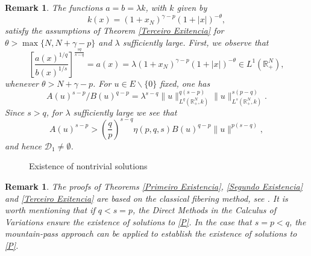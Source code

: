 \documentclass[12pt,reqno]{amsart}
\newtheorem{remark}[theorem]{Remark}
\begin{document}
\begin{remark}
The functions $a=b=\lambda k$, with $k$ given by
\[
k(x)=(1+x_N)^{\gamma-p}(1+|x|)^{-\theta},
\]
satisfy the assumptions of Theorem \ref{Terceiro Exitencia} for $\theta>\max\{N,N+\gamma-p\}$ and $\lambda$ sufficiently large. First, we observe that 
\[
\left[\frac{a(x)^{1/q}}{b(x)^{1/s}}\right]^{\frac{sq}{s-q}}=a(x)=\lambda (1+x_N)^{\gamma-p}(1+|x|)^{-\theta}\in L^1(\mathds{R}^N_+), 
\]
whenever $\theta>N+\gamma-p$. For $u \in E\backslash\{0\}$ fixed, one has 
$$
{A(u)^{s-p}}/{B(u)^{q-p}}=\lambda^{s-q}\|u\|_{L^q(\mathds{R}^N_+,k)}^{q(s-p)}\|u\|_{L^s(\mathds{R}^N_+,k)}^{s(p-q)}.
$$
Since $s>q$, for $\lambda$ sufficiently large we see that $$
A(u)^{s-p}>\left(\frac{q}{p}\right)^{s-q}\eta(p,q,s)B(u)^{q-p}\|u\|^{p(s-q)},
$$ 
and hence $\mathcal{D}_1\neq \emptyset$.
\end{remark}

\begin{figure}[h]
    \centering
{}
    \caption{Existence of nontrivial solutions}
    \label{fig:enter-label}
\end{figure}

\begin{remark}
    The proofs of Theorems \ref{Primeiro Existencia}, \ref{Segundo Existencia} and \ref{Terceiro Exitencia}  are based on the classical fibering method, see \cite{zbMATH01060125,zbMATH05077864,zbMATH05640324,zbMATH03714430, zbMATH05635193}.
   It is worth mentioning that if $q<s=p$, the Direct Methods in the Calculus of Variations ensure the existence of solutions to \eqref{P}. In the case that $s=p<q$, the mountain-pass approach can be applied to establish the existence of solutions to \eqref{P}.
\end{remark}
\end{document}
